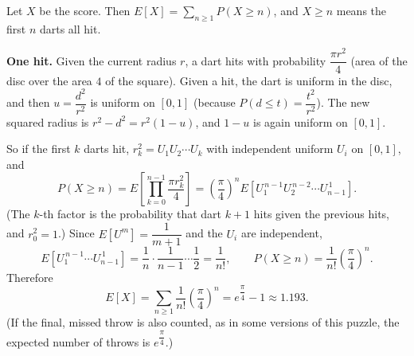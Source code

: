 Let $X$ be the score. Then $E[X]=\sum_{n\ge1}P(X\ge n)$, and $X\ge n$ means the first $n$ darts all hit.

\textbf{One hit.} Given the current radius $r$, a dart hits with probability $\dfrac{\pi r^2}{4}$ (area of the disc over the area $4$ of the square). Given a hit, the dart is uniform in the disc, and then $u=\dfrac{d^2}{r^2}$ is uniform on $[0,1]$ (because $P(d\le t)=\dfrac{t^2}{r^2}$). The new squared radius is $r^2-d^2=r^2(1-u)$, and $1-u$ is again uniform on $[0,1]$.

So if the first $k$ darts hit, $r_k^2=U_1U_2\cdots U_k$ with independent uniform $U_i$ on $[0,1]$, and
\[
P(X\ge n)=E\left[\prod_{k=0}^{n-1}\dfrac{\pi r_k^2}{4}\right]=\left(\dfrac{\pi}{4}\right)^n E\left[U_1^{\,n-1}U_2^{\,n-2}\cdots U_{n-1}^{\,1}\right].
\]
(The $k$-th factor is the probability that dart $k+1$ hits given the previous hits, and $r_0^2=1$.) Since $E[U^m]=\dfrac{1}{m+1}$ and the $U_i$ are independent,
\[
E\left[U_1^{\,n-1}\cdots U_{n-1}^{\,1}\right]=\dfrac{1}{n}\cdot\dfrac{1}{n-1}\cdots\dfrac{1}{2}=\dfrac{1}{n!},\qquad P(X\ge n)=\dfrac{1}{n!}\left(\dfrac{\pi}{4}\right)^n .
\]
Therefore
\[
E[X]=\sum_{n\ge1}\dfrac{1}{n!}\left(\dfrac{\pi}{4}\right)^n=\boxed{e^{\dfrac{\pi}{4}}-1}\approx1.193 .
\]
(If the final, missed throw is also counted, as in some versions of this puzzle, the expected number of throws is $e^{\dfrac{\pi}{4}}$.)
